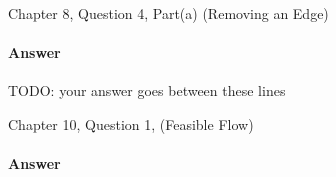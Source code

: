 \documentclass{article}
\begin{document}
\iffalse
\begin{enumerate}
	\item
		Super easy. It is the exact same logic as the minimum spanning tree.
		For no particular
		reason, I am going to just do prims algorithm with a few words
		changed around. The input is a connected graph, $G$, the output is a tree $T
		\subset G$ that contains each vertex of $G$. 
	\item I am going to use prims algorithm with minimum exchanged with
		maximum.
	\item 
		\begin{algorithm}[h]
			\KwData{Connected Graph $G$}\\
			\KwResult{Maximum Spanning Tree, $T$}\\
			UnvisitedVerts = $G$.verts\\
			VisitedVerts = []\\

			VisitedVerts.append($UnvisitedVerts$.pop)\\
			\While{UnvisitedVerts $not$ empty}
			{
				FindPoop


				}
			
		\end{algorithm}
	\item Termination
	\item 
			



\end{enumerate}
\fi



\nextprob
{}

Chapter 8, Question 4, Part(a) (Removing an Edge)

\paragraph{Answer}


TODO: your answer goes between these lines


\nextprob
{}

Chapter 10, Question 1, (Feasible Flow)

\paragraph{Answer}
\end{document}
